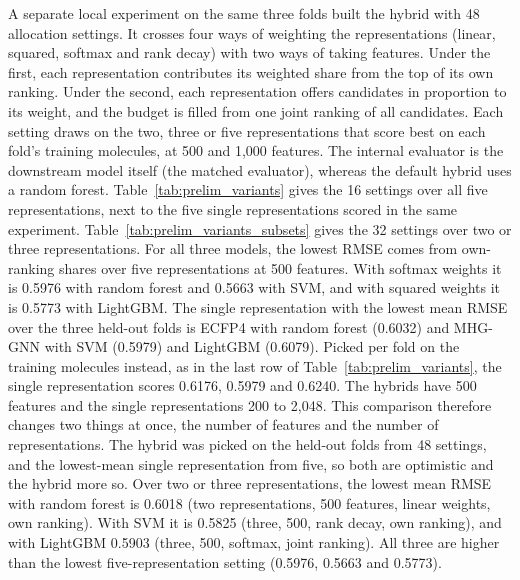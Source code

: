 A separate local experiment on the same three folds built the hybrid with 48 allocation settings. It crosses four ways of weighting the representations (linear, squared, softmax and rank decay) with two ways of taking features. Under the first, each representation contributes its weighted share from the top of its own ranking. Under the second, each representation offers candidates in proportion to its weight, and the budget is filled from one joint ranking of all candidates. Each setting draws on the two, three or five representations that score best on each fold's training molecules, at 500 and 1,000 features. The internal evaluator is the downstream model itself (the matched evaluator), whereas the default hybrid uses a random forest. Table~\ref{tab:prelim_variants} gives the 16 settings over all five representations, next to the five single representations scored in the same experiment. Table~\ref{tab:prelim_variants_subsets} gives the 32 settings over two or three representations. For all three models, the lowest RMSE comes from own-ranking shares over five representations at 500 features. With softmax weights it is 0.5976 with random forest and 0.5663 with SVM, and with squared weights it is 0.5773 with LightGBM. The single representation with the lowest mean RMSE over the three held-out folds is ECFP4 with random forest (0.6032) and MHG-GNN with SVM (0.5979) and LightGBM (0.6079). Picked per fold on the training molecules instead, as in the last row of Table~\ref{tab:prelim_variants}, the single representation scores 0.6176, 0.5979 and 0.6240. The hybrids have 500 features and the single representations 200 to 2,048. This comparison therefore changes two things at once, the number of features and the number of representations. The hybrid was picked on the held-out folds from 48 settings, and the lowest-mean single representation from five, so both are optimistic and the hybrid more so. Over two or three representations, the lowest mean RMSE with random forest is 0.6018 (two representations, 500 features, linear weights, own ranking). With SVM it is 0.5825 (three, 500, rank decay, own ranking), and with LightGBM 0.5903 (three, 500, softmax, joint ranking). All three are higher than the lowest five-representation setting (0.5976, 0.5663 and 0.5773).

